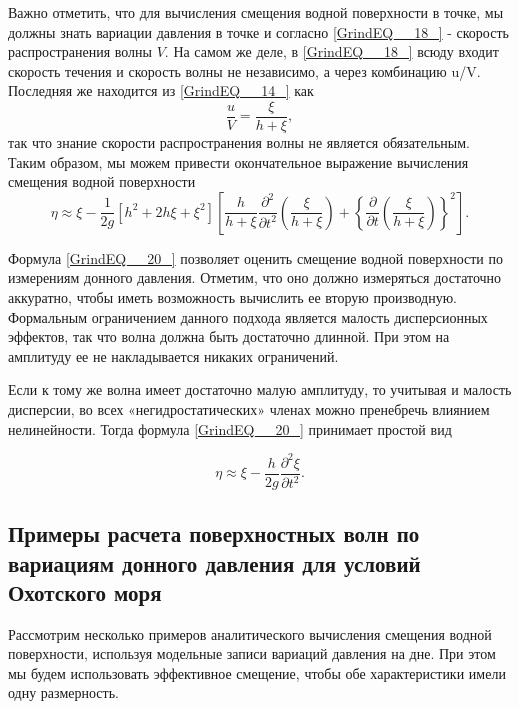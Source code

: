 Важно отметить, что для вычисления смещения водной поверхности в точке, мы должны знать вариации давления в точке и согласно \eqref{GrindEQ__18_} - скорость распространения волны $V$. На самом же деле, в \eqref{GrindEQ__18_} всюду входит скорость течения и скорость волны не независимо, а через комбинацию u/V. Последняя же находится из \eqref{GrindEQ__14_} как
\begin{equation} \label{GrindEQ__19_}
\frac{u}{V} =\frac{\xi }{h+\xi } ,
\end{equation}
так что знание скорости распространения волны не является обязательным. Таким образом, мы можем привести окончательное выражение вычисления смещения водной поверхности
\begin{equation} \label{GrindEQ__20_}
\eta \approx \xi -\frac{1}{2g} \left[h^{2} +2h\xi +\xi ^{2} \right]\left[\frac{h}{h+\xi } \frac{\partial ^{2} }{\partial t^{2} } \left(\frac{\xi }{h+\xi } \right)+\left\{\frac{\partial }{\partial t} \left(\frac{\xi }{h+\xi } \right)\right\}^{2} \right].
\end{equation}

Формула \eqref{GrindEQ__20_} позволяет оценить смещение водной поверхности по измерениям донного давления. Отметим, что оно должно измеряться достаточно аккуратно, чтобы иметь возможность вычислить ее вторую производную. Формальным ограничением данного подхода является малость дисперсионных эффектов, так что волна должна быть достаточно длинной. При этом на амплитуду ее не накладывается никаких ограничений.

Если к тому же волна имеет достаточно малую амплитуду, то учитывая и малость дисперсии, во всех «негидростатических» членах можно пренебречь влиянием нелинейности. Тогда формула \eqref{GrindEQ__20_} принимает простой вид

\begin{equation} \label{GrindEQ__21_}
\eta \approx \xi -\frac{h}{2g} \frac{\partial ^{2} \xi }{\partial t^{2} } .
\end{equation}

\subsection{Примеры расчета поверхностных волн по вариациям донного давления для условий Охотского моря}

Рассмотрим несколько примеров аналитического вычисления смещения водной поверхности, используя модельные записи вариаций давления на дне. При этом мы будем использовать эффективное смещение, чтобы обе характеристики имели одну размерность.

